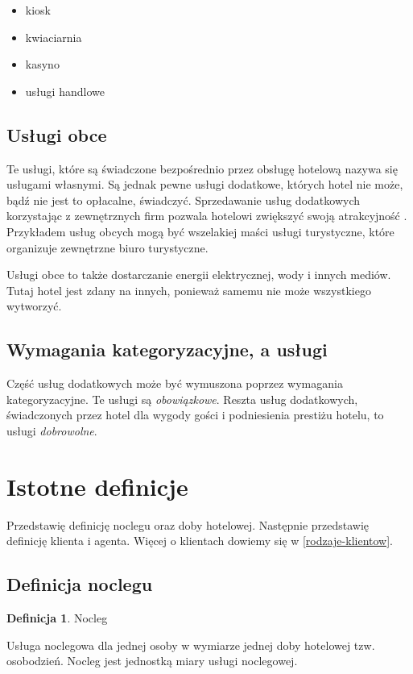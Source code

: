 \documentclass[a4paper,onecolumn,oneside,11pt,wide,floatssmall]{mwrep}
\theoremstyle{definition}
\newtheorem{defn}{Definicja}[section]
\theoremstyle{plain}%
\theoremstyle{remark}
\begin{document}
\begin{itemize}
  \item kiosk
  \item kwiaciarnia
  \item kasyno
  \item usługi handlowe
\end{itemize}

\subsection{Usługi obce}
Te usługi, które są świadczone bezpośrednio przez obsługę hotelową nazywa 
się usługami własnymi. Są jednak pewne usługi dodatkowe, których hotel nie 
może, bądź nie jest to opłacalne, świadczyć. Sprzedawanie usług dodatkowych 
korzystając z zewnętrznych firm pozwala hotelowi zwiększyć swoją atrakcyjność
. Przykładem usług obcych mogą być wszelakiej maści usługi turystyczne, 
które organizuje zewnętrzne biuro turystyczne.

Usługi obce to także dostarczanie energii elektrycznej, wody i innych mediów.
 Tutaj hotel jest zdany na innych, ponieważ samemu nie może wszystkiego 
wytworzyć.

\subsection{Wymagania kategoryzacyjne, a usługi}
Część usług dodatkowych może być wymuszona poprzez wymagania kategoryzacyjne.
 Te usługi są \emph{obowiązkowe}. Reszta usług dodatkowych, świadczonych 
 przez hotel dla wygody gości i podniesienia prestiżu 
 hotelu, to usługi \emph{dobrowolne}.

\section{Istotne definicje}
Przedstawię definicję noclegu oraz doby hotelowej. Następnie przedstawię 
definicję klienta i agenta. Więcej o klientach dowiemy się w
 \ref{rodzaje-klientow}.

\subsection{Definicja noclegu}

\begin{defn}{Nocleg}

Usługa noclegowa dla jednej osoby w wymiarze jednej doby hotelowej tzw. 
osobodzień. Nocleg jest jednostką miary usługi noclegowej.

\end{defn} 
\end{document}
